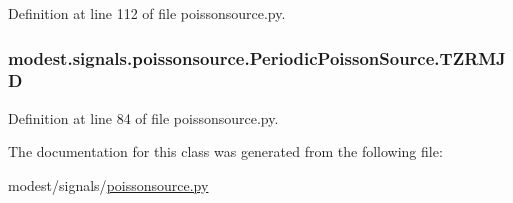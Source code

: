 Definition at line 112 of file poissonsource.\+py.

\subsubsection[{\texorpdfstring{T\+Z\+R\+M\+JD}{TZRMJD}}]{\setlength{\rightskip}{0pt plus 5cm}modest.\+signals.\+poissonsource.\+Periodic\+Poisson\+Source.\+T\+Z\+R\+M\+JD}\hypertarget{classmodest_1_1signals_1_1poissonsource_1_1PeriodicPoissonSource_a98bc97a480e5b3f11c337644ad409b4c}{}\label{classmodest_1_1signals_1_1poissonsource_1_1PeriodicPoissonSource_a98bc97a480e5b3f11c337644ad409b4c}


Definition at line 84 of file poissonsource.\+py.



The documentation for this class was generated from the following file\+:\begin{DoxyCompactItemize}
\item 
modest/signals/\hyperlink{poissonsource_8py}{poissonsource.\+py}\end{DoxyCompactItemize}

